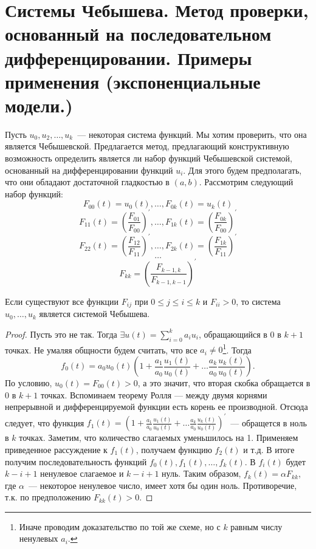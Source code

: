 
\section{Системы Чебышева. Метод проверки, основанный на последовательном дифференцировании. Примеры применения (экспоненциальные модели.)}

Пусть $u_0, u_2,…, u_k$ — некоторая система функций. Мы хотим проверить, что она является Чебышевской.
Предлагается метод, предлагающий конструктивную возможность определить является ли набор функций Чебышевской системой,
основанный на дифференцировании функций $u_i$. Для этого будем предполагать, что они обладают достаточной гладкостью в $(a, b)$.
Рассмотрим следующий набор функций:
$$ F_{00}(t) = u_0(t), …, F_{0k}(t) = u_k(t)$$
$$F_{11}(t) = \left(\frac{F_{01}}{F_{00}}\right)^{'}, …, F_{1k}(t) = \left(\frac{F_{0k}}{F_{00}}\right)^{'}$$
$$F_{22}(t) = \left(\frac{F_{12}}{F_{11}}\right)^{'}, …, F_{2k}(t) = \left(\frac{F_{1k}}{F_{11}}\right)^{'} $$
$$ … $$
$$F_{kk} = \left(\frac{F_{k-1, k}}{F_{k-1, k-1}}\right)^{'}$$
\begin{thm}
\label{seqDerTh}
Если существуют все функции $F_{ij}$ при $0 \le j \le i \le k$ и $F_{ii} > 0$, то система $u_0, …, u_k$ является системой Чебышева.
\end{thm}
\begin{proof}
    Пусть это не так. Тогда $\exists u(t) = \sum \limits_{i=0}^{k} a_i u_i$, обращающийся в 0 в $k+1$ точках. Не умаляя общности будем считать, что все $a_i \neq 0$\footnote{Иначе
    проводим доказательство по той же схеме, но с $k$ равным числу ненулевых $a_i$.}.
Тогда
$$ f_0(t) = a_0u_0(t)\left(1 + \frac{a_1}{a_0} \frac{u_1(t)}{u_0(t)} + … \frac{a_k}{a_0}\frac{u_k(t)}{u_0(t)}\right).$$
По условию, $u_0(t) = F_{00}(t) > 0$, а это значит, что вторая скобка обращается в 0 в $k+1$ точках. Вспоминаем теорему Ролля — между двумя корнями непрерывной и дифференцируемой функции есть корень ее производной. Отсюда следует, что функция 
$f_1(t) = \left(1 + \frac{a_1}{a_0} \frac{u_1(t)}{u_0(t)} + … \frac{a_k}{a_0}\frac{u_k(t)}{u_0(t)}\right)^{'}$ — обращется в ноль в $k$ точках. Заметим, что количество слагаемых уменьшилось на 1.
Применяем приведенное рассуждение к $f_1(t)$, получаем функцию $f_2(t)$ и т.д. В итоге получим 
последовательность функций $f_0(t), f_1(t), …, f_k(t)$.
В $f_i(t)$ будет $k-i+1$ ненулевое слагаемое и $k-i+1$ нуль.
Таким образом, $f_k(t) = \alpha F_{kk}$, где $\alpha$ — некоторое ненулевое число, имеет хотя бы один ноль. Противоречие, т.к. по предположению $F_{kk}(t) > 0$.
\end{proof}

